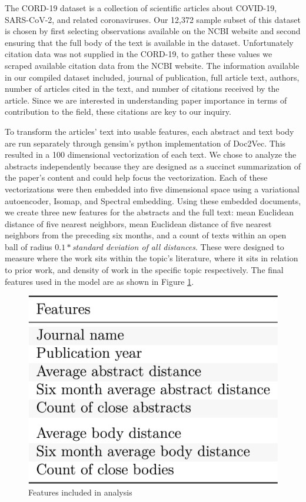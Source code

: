 \documentclass{article} %
\begin{document}
The CORD-19 dataset is a collection of scientific articles about COVID-19, SARS-CoV-2, and related coronaviruses. Our 12,372 sample subset of this dataset is chosen by first selecting observations available on the NCBI website and second ensuring that the full body of the text is available in the dataset. Unfortunately citation data was not supplied in the CORD-19, to gather these values we scraped available citation data from the NCBI website. The information available in our compiled dataset included, journal of publication, full article text, authors, number of articles cited in the text, and number of citations received by the article. Since we are interested in understanding paper importance in terms of contribution to the field, these citations are key to our inquiry.

To transform the articles' text into usable features, each abstract and text body are run separately through gensim's python implementation of Doc2Vec. This resulted in a 100 dimensional vectorization of each text. We chose to analyze the abstracts independently because they are designed as a succinct summarization of the paper's content and could help focus the vectorization. Each of these vectorizations were then embedded into five dimensional space using a variational autoencoder, Isomap, and Spectral embedding. Using these embedded documents, we create three new features for the abstracts and the full text: mean Euclidean distance of five nearest neighbors, mean Euclidean distance of five nearest neighbors from the preceding six months, and a count of texts within an open ball of radius $0.1 * $\textit{standard deviation of all distances}. These were designed to measure where the work sits within the topic's literature, where it sits in relation to prior work, and density of work in the specific topic respectively. The final features used in the model are as shown in Figure \ref{features}.

\begin{figure}[h]
\begin{center}
  \includegraphics[scale=0.17]{../Figures/features.png}
\end{center}
\caption{Features included in analysis}
\label{features}
\end{figure}
\end{document}
